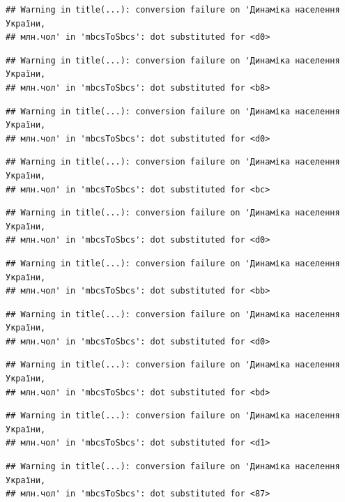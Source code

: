\documentclass[
]{article}
\begin{document}
\begin{verbatim}
## Warning in title(...): conversion failure on 'Динаміка населення України,
## млн.чол' in 'mbcsToSbcs': dot substituted for <d0>
\end{verbatim}

\begin{verbatim}
## Warning in title(...): conversion failure on 'Динаміка населення України,
## млн.чол' in 'mbcsToSbcs': dot substituted for <b8>
\end{verbatim}

\begin{verbatim}
## Warning in title(...): conversion failure on 'Динаміка населення України,
## млн.чол' in 'mbcsToSbcs': dot substituted for <d0>
\end{verbatim}

\begin{verbatim}
## Warning in title(...): conversion failure on 'Динаміка населення України,
## млн.чол' in 'mbcsToSbcs': dot substituted for <bc>
\end{verbatim}

\begin{verbatim}
## Warning in title(...): conversion failure on 'Динаміка населення України,
## млн.чол' in 'mbcsToSbcs': dot substituted for <d0>
\end{verbatim}

\begin{verbatim}
## Warning in title(...): conversion failure on 'Динаміка населення України,
## млн.чол' in 'mbcsToSbcs': dot substituted for <bb>
\end{verbatim}

\begin{verbatim}
## Warning in title(...): conversion failure on 'Динаміка населення України,
## млн.чол' in 'mbcsToSbcs': dot substituted for <d0>
\end{verbatim}

\begin{verbatim}
## Warning in title(...): conversion failure on 'Динаміка населення України,
## млн.чол' in 'mbcsToSbcs': dot substituted for <bd>
\end{verbatim}

\begin{verbatim}
## Warning in title(...): conversion failure on 'Динаміка населення України,
## млн.чол' in 'mbcsToSbcs': dot substituted for <d1>
\end{verbatim}

\begin{verbatim}
## Warning in title(...): conversion failure on 'Динаміка населення України,
## млн.чол' in 'mbcsToSbcs': dot substituted for <87>
\end{verbatim}
\end{document}
